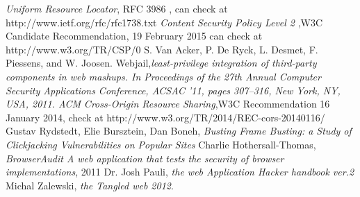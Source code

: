 \documentclass[a4paper,12pt]{paper}
\begin{document}
\begin{thebibliography}{1}
  \emph{Uniform Resource Locator}, RFC 3986 , can check at http://www.ietf.org/rfc/rfc1738.txt
  \emph{Content Security Policy Level 2} ,W3C Candidate Recommendation, 19 February 2015 can check at http://www.w3.org/TR/CSP/0
  S. Van Acker, P. De Ryck, L. Desmet, F. Piessens, and W. Joosen. Webjail,\emph {least-privilege integration of third-party components in web mashups. In Proceedings of the 27th Annual Computer Security
Applications Conference, ACSAC ’11, pages 307–316, New York, NY, USA, 2011. ACM}
 \emph{Cross-Origin Resource Sharing},W3C Recommendation 16 January 2014, check at http://www.w3.org/TR/2014/REC-cors-20140116/
  Gustav Rydstedt, Elie Bursztein, Dan Boneh, \emph{Busting Frame Busting: a Study of Clickjacking Vulnerabilities on Popular Sites} 
  Charlie Hothersall-Thomas, \emph{BrowserAudit A web application that tests the security of browser implementations}, 2011
  Dr. Josh Pauli, \emph{the web Application Hacker handbook ver.2}
  Michal Zalewski, \emph{the Tangled web 2012}.
\end{thebibliography}
\end{document}
